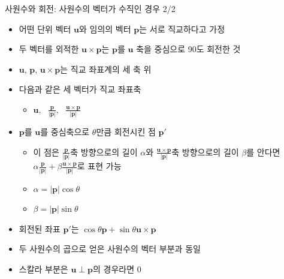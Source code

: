 \begin{frame}[fragile]{사원수와 회전: 사원수의 벡터가 수직인 경우 2/2}


\begin{itemize}
\item 어떤 단위 벡터 $\mathbf u$와 임의의 벡터 $\mathbf p$는 서로 직교하다고 가정
\item 두 벡터를 외적한 $\mathbf u \times \mathbf p$는 $\mathbf p$를 $\mathbf u$ 축을 중심으로 90도 회전한 것
\item $\mathbf u$, $\mathbf p$, $\mathbf u \times \mathbf p$는 직교 좌표계의 세 축 위
\item 다음과 같은 세 벡터가 직교 좌표축
	\begin{itemize}
	\item $\mathbf u, ~~~\frac{\mathbf p}{ |\mathbf p| }, ~~~\frac{\mathbf u \times \mathbf p}{|\mathbf p|}$
	\end{itemize}
\item $\mathbf p$를 $\mathbf u$를 중심축으로 $\theta$만큼 회전시킨 점 $\mathbf p'$
	\begin{itemize}
	\item  이 점은 $\frac{\mathbf p}{ |\mathbf p| }$축 방향으로의 길이 $\alpha$와 $\frac{\mathbf u \times \mathbf p}{|\mathbf p|}$축 방향으로의 
길이 $\beta$를 안다면 $\alpha \frac{\mathbf p}{ |\mathbf p| } + \beta \frac{\mathbf u \times \mathbf p}{|\mathbf p|}$로 표현 가능
	\item $\alpha = |\mathbf p| \cos \theta$
	\item $\beta = |\mathbf p| \sin \theta$
	\end{itemize}
\item 회전된 좌표 $\mathbf p'$는 $ \cos \theta \mathbf p + \sin \theta \mathbf u \times \mathbf p$
\item 두 사원수의 곱으로 얻은 사원수의 벡터 부분과 동일
\item 스칼라 부분은 $\mathbf u  \perp \mathbf p$의 경우라면 0
\end{itemize}

\end{frame}

